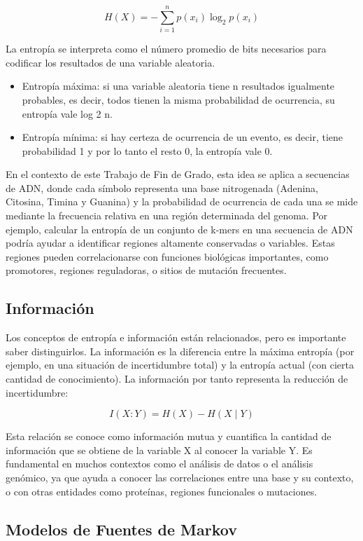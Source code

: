 \documentclass[11pt,spanish,listoffigures,listoftables]{tfgetsinf}
\begin{document}
\[
H(X) = - \sum_{i=1}^{n} p(x_i) \log_2 p(x_i)
\]

La entropía se interpreta como el número promedio de bits necesarios para codificar los resultados de una variable aleatoria. 

\begin{itemize}
   \item Entropía máxima: si una variable aleatoria tiene n resultados igualmente probables, es decir, todos tienen la misma probabilidad de ocurrencia, su entropía vale log 2 n. 
   \item Entropía mínima: si hay certeza de ocurrencia de un evento, es decir, tiene probabilidad 1 y por lo tanto el resto 0, la entropía vale 0.
\end{itemize}
 
En el contexto de este Trabajo de Fin de Grado, esta idea se aplica a secuencias de ADN, donde cada símbolo representa una base nitrogenada (Adenina, Citosina, Timina y Guanina) y la probabilidad de ocurrencia de cada una se mide mediante la frecuencia relativa en una región determinada del genoma. Por ejemplo, calcular la entropía de un conjunto de k-mers en una secuencia de ADN podría ayudar a identificar regiones altamente conservadas o variables. Estas regiones pueden correlacionarse con funciones biológicas importantes, como promotores, regiones reguladoras, o sitios de mutación frecuentes. 

\subsection{Información}

Los conceptos de entropía e información están relacionados, pero es importante saber distinguirlos. La información es la diferencia entre la máxima entropía (por ejemplo, en una situación de incertidumbre total) y la entropía actual (con cierta cantidad de conocimiento). La información por tanto representa la reducción de incertidumbre:

\[
I(X:Y) = H(X) - H(X \mid Y)
\]

Esta relación se conoce como información mutua y cuantifica la cantidad de información que se obtiene de la variable X al conocer la variable Y. Es fundamental en muchos contextos como el análisis de datos o el análisis genómico, ya que ayuda a conocer las correlaciones entre una base y su contexto, o con otras entidades como proteínas, regiones funcionales o mutaciones. 


\subsection{Modelos de Fuentes de Markov}
\end{document}

